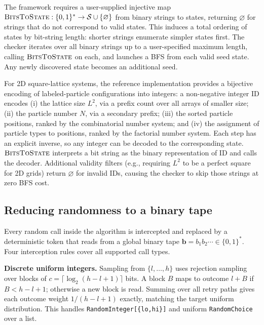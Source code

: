 \documentclass[twocolumn,10pt]{article}
\begin{document}
The framework requires a user-supplied injective map
$\textsc{BitsToState}:\{0,1\}^\ast\to\mathcal{S}\cup\{\varnothing\}$ from
binary strings to states, returning $\varnothing$ for strings that do not
correspond to valid states.  This induces a total ordering of states by
bit-string length: shorter strings enumerate simpler states first.  The
checker iterates over all binary strings up to a user-specified maximum
length, calling $\textsc{BitsToState}$ on each, and launches a BFS
from each valid seed state.  Any newly discovered state becomes an
additional seed.

For 2D square-lattice systems, the reference implementation provides a
bijective encoding of labeled-particle configurations into integers: a
non-negative integer $\mathrm{ID}$ encodes (i) the lattice size $L^2$, via
a prefix count over all arrays of smaller size; (ii) the particle number
$N$, via a secondary prefix; (iii) the sorted particle positions, ranked by
the combinatorial number system; and (iv) the assignment of particle types to
positions, ranked by the factorial number system.  Each step has an explicit
inverse, so any integer can be decoded to the corresponding state.
$\textsc{BitsToState}$ interprets a bit string as the binary representation
of $\mathrm{ID}$ and calls the decoder.  Additional validity filters (e.g.,
requiring $L^2$ to be a perfect square for 2D grids) return $\varnothing$
for invalid IDs, causing the checker to skip those strings at zero BFS cost.

\subsection{Reducing randomness to a binary tape}
\label{sec:bits}

Every random call inside the algorithm is intercepted and replaced by a
deterministic token that reads from a global binary tape
$\mathbf{b}=b_1b_2\cdots\in\{0,1\}^\ast$.  Four interception rules cover all
supported call types.

\smallskip\noindent\textbf{Discrete uniform integers.}
Sampling from $\{l,\ldots,h\}$ uses rejection sampling over blocks of
$c=\lceil\log_2(h-l+1)\rceil$ bits.  A block $B$ maps to outcome $l+B$ if
$B < h-l+1$; otherwise a new block is read.  Summing over all retry paths
gives each outcome weight $1/(h-l+1)$ exactly, matching the target uniform
distribution.  This handles \texttt{RandomInteger[\{lo,hi\}]} and uniform
\texttt{RandomChoice} over a list.
\end{document}
